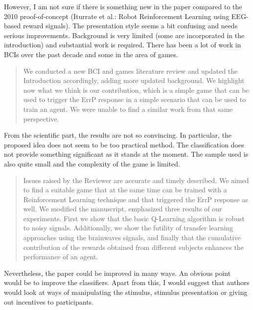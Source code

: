 \documentclass[journal,onecolumn,12pt]{IEEEtran}
\begin{document}
However, I am not sure if there is something new in the paper compared to the 2010 proof-of-concept (Iturrate et al.: Robot Reinforcement Learning using EEG-based reward signals). The presentation style seems a bit confusing and needs serious improvements. Background is very limited (some are incorporated in the introduction) and substantial work is required. There has been a lot of work in BCIs over the past decade and some in the area of games.

\begin{quotation}
{\color{blue}
We conducted a new BCI and games literature review and updated the Introduction accordingly, adding more updated background.  We highlight now what we think is our contribution, which is a simple game that can be used to trigger the ErrP response in a simple scenario that can be used to train an agent.  We were unable to find a similar work from that same perspective.  
}
\end{quotation}


From the scientific part, the results are not so convincing. In particular, the proposed idea does not seem to be too practical method. The classification does not provide something significant as it stands at the moment. The sample used is also quite small and the complexity of the game is limited.

\begin{quotation}
{\color{blue}
Issues raised by the Reviewer are accurate and timely described.  We aimed to find a suitable game that at the same time can be trained with a Reinforcement Learning technique and that triggered the ErrP response as well.  We modified the manuscript, emphasized three results of our experiments.  First we show that the basic Q-Learning algorithm is robust to noisy signals.  Additionally,  we show the futility of transfer learning approaches using the brainwaves signals, and finally that the cumulative contribution of the rewards obtained from different subjects enhances the performance of an agent.
}
\end{quotation}


Nevertheless, the paper could be improved in many ways. An obvious point would be to improve the classifiers. Apart from this, I would suggest that authors would look at ways of manipulating the stimulus, stimulus presentation or giving out incentives to participants.
\end{document}
